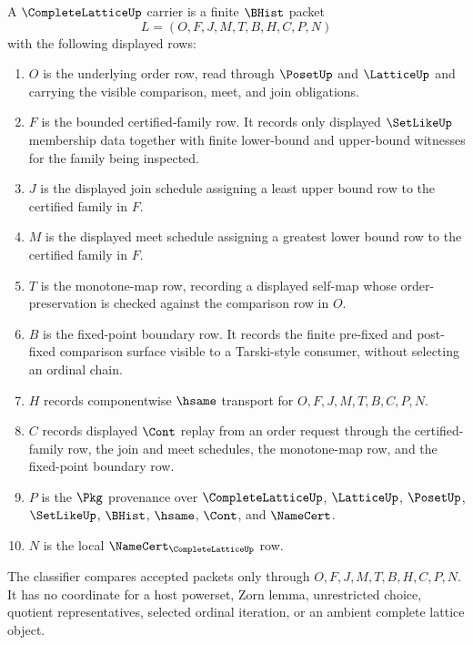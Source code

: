 \begin{definition}
\label{def:complete-lattice-carrier}
A $\CompleteLatticeUp$ carrier is a finite $\BHist$ packet
$$
L=(O,F,J,M,T,B,H,C,P,N)
$$
with the following displayed rows:
\begin{enumerate}
\item $O$ is the underlying order row, read through $\PosetUp$ and $\LatticeUp$ and carrying the visible comparison, meet, and join obligations.
\item $F$ is the bounded certified-family row. It records only displayed $\SetLikeUp$ membership data together with finite lower-bound and upper-bound witnesses for the family being inspected.
\item $J$ is the displayed join schedule assigning a least upper bound row to the certified family in $F$.
\item $M$ is the displayed meet schedule assigning a greatest lower bound row to the certified family in $F$.
\item $T$ is the monotone-map row, recording a displayed self-map whose order-preservation is checked against the comparison row in $O$.
\item $B$ is the fixed-point boundary row. It records the finite pre-fixed and post-fixed comparison surface visible to a Tarski-style consumer, without selecting an ordinal chain.
\item $H$ records componentwise $\hsame$ transport for $O,F,J,M,T,B,C,P,N$.
\item $C$ records displayed $\Cont$ replay from an order request through the certified-family row, the join and meet schedules, the monotone-map row, and the fixed-point boundary row.
\item $P$ is the $\Pkg$ provenance over $\CompleteLatticeUp$, $\LatticeUp$, $\PosetUp$, $\SetLikeUp$, $\BHist$, $\hsame$, $\Cont$, and $\NameCert$.
\item $N$ is the local $\NameCert_{\CompleteLatticeUp}$ row.
\end{enumerate}
The classifier compares accepted packets only through $O,F,J,M,T,B,H,C,P,N$. It has no coordinate for a host powerset, Zorn lemma, unrestricted choice, quotient representatives, selected ordinal iteration, or an ambient complete lattice object.
\end{definition}

